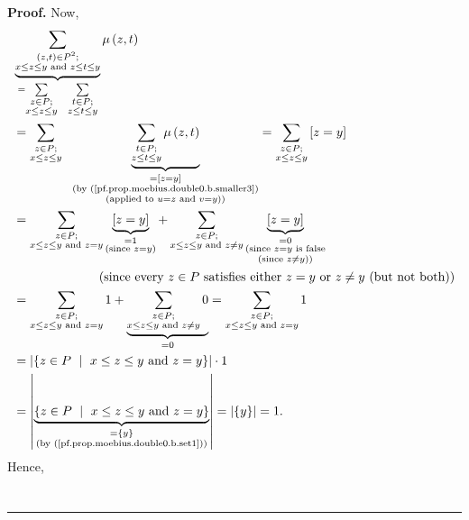 \documentclass[numbers=enddot,12pt,final,onecolumn,notitlepage]{scrartcl}%
\theoremstyle{definition}
\newenvironment{proof}[1][Proof]{\noindent\textbf{#1.} }{\ \rule{0.5em}{0.5em}}
\newenvironment{verlong}{}{}
\let\sumnonlimits\sum
\renewcommand{\sum}{\sumnonlimits\limits}
\begin{document}
\begin{verlong}
\begin{proof}
Now,%
\begin{align*}
&  \underbrace{\sum_{\substack{\left(  z,t\right)  \in P^{2};\\x\leq z\leq
y\text{ and }z\leq t\leq y}}}_{=\sum_{\substack{z\in P;\\x\leq z\leq
y}}\ \ \sum_{\substack{t\in P;\\z\leq t\leq y}}}\mu\left(  z,t\right) \\
&  =\sum_{\substack{z\in P;\\x\leq z\leq y}}\ \ \underbrace{\sum
_{\substack{t\in P;\\z\leq t\leq y}}\mu\left(  z,t\right)  }%
_{\substack{=\left[  z=y\right]  \\\text{(by
(\ref{pf.prop.moebius.double0.b.smaller3})}\\\text{(applied to }u=z\text{ and
}v=y\text{))}}}=\sum_{\substack{z\in P;\\x\leq z\leq y}}\left[  z=y\right] \\
&  =\sum_{\substack{z\in P;\\x\leq z\leq y\text{ and }z=y}}\underbrace{\left[
z=y\right]  }_{\substack{=1\\\text{(since }z=y\text{)}}}+\sum_{\substack{z\in
P;\\x\leq z\leq y\text{ and }z\neq y}}\underbrace{\left[  z=y\right]
}_{\substack{=0\\\text{(since }z=y\text{ is false}\\\text{(since }z\neq
y\text{))}}}\\
&  \ \ \ \ \ \ \ \ \ \ \ \ \ \ \ \ \ \ \ \ \left(  \text{since every }z\in
P\text{ satisfies either }z=y\text{ or }z\neq y\text{ (but not both)}\right)
\\
&  =\sum_{\substack{z\in P;\\x\leq z\leq y\text{ and }z=y}}1+\underbrace{\sum
_{\substack{z\in P;\\x\leq z\leq y\text{ and }z\neq y}}0}_{=0}=\sum
_{\substack{z\in P;\\x\leq z\leq y\text{ and }z=y}}1\\
&  =\left\vert \left\{  z\in P\ \mid\ x\leq z\leq y\text{ and }z=y\right\}
\right\vert \cdot1\\
&  =\left\vert \underbrace{\left\{  z\in P\ \mid\ x\leq z\leq y\text{ and
}z=y\right\}  }_{\substack{=\left\{  y\right\}  \\\text{(by
(\ref{pf.prop.moebius.double0.b.set1}))}}}\right\vert =\left\vert \left\{
y\right\}  \right\vert =1.
\end{align*}
Hence,%
\begin{align*}

\end{align*}
\end{proof}
\end{verlong}
\end{document}
